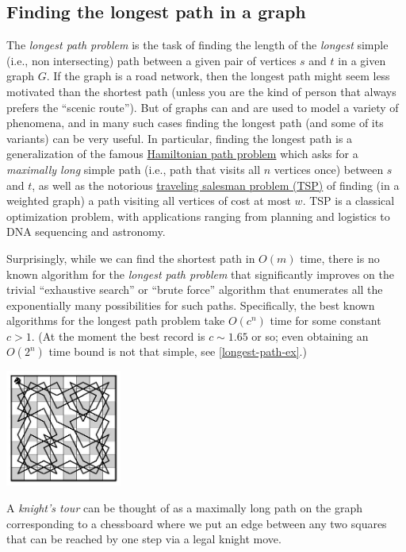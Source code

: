 \subsection{Finding the longest path in a
graph}\label{Finding-the-longest-path-}

The \emph{longest path problem} is the task of finding the length of the
\emph{longest} simple (i.e., non intersecting) path between a given pair
of vertices \(s\) and \(t\) in a given graph \(G\). If the graph is a
road network, then the longest path might seem less motivated than the
shortest path (unless you are the kind of person that always prefers the
``scenic route''). But of graphs can and are used to model a variety of
phenomena, and in many such cases finding the longest path (and some of
its variants) can be very useful. In particular, finding the longest
path is a generalization of the famous
\href{https://en.wikipedia.org/wiki/Hamiltonian_path_problem}{Hamiltonian
path problem} which asks for a \emph{maximally long} simple path (i.e.,
path that visits all \(n\) vertices once) between \(s\) and \(t\), as
well as the notorious
\href{https://en.wikipedia.org/wiki/Travelling_salesman_problem}{traveling
salesman problem (TSP)} of finding (in a weighted graph) a path visiting
all vertices of cost at most \(w\). TSP is a classical optimization
problem, with applications ranging from planning and logistics to DNA
sequencing and astronomy.

Surprisingly, while we can find the shortest path in \(O(m)\) time,
there is no known algorithm for the \emph{longest path problem} that
significantly improves on the trivial ``exhaustive search'' or ``brute
force'' algorithm that enumerates all the exponentially many
possibilities for such paths. Specifically, the best known algorithms
for the longest path problem take \(O(c^n)\) time for some constant
\(c>1\). (At the moment the best record is \(c \sim 1.65\) or so; even
obtaining an \(O(2^n)\) time bound is not that simple, see
\cref{longest-path-ex}.)


\begin{marginfigure}
\centering
\includegraphics[width=\linewidth, height=1.5in, keepaspectratio]{../figure/knights_tour.jpg}
\caption{A \emph{knight's tour} can be thought of as a maximally long
path on the graph corresponding to a chessboard where we put an edge
between any two squares that can be reached by one step via a legal
knight move.}
\label{knighttourpath}
\end{marginfigure}

